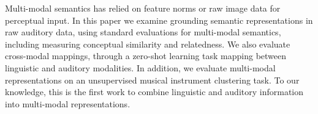 Multi-modal semantics has relied on feature norms or raw image data for perceptual input. In this paper we examine grounding semantic representations in raw auditory data, using standard evaluations for multi-modal semantics, including measuring conceptual similarity and relatedness. We also evaluate cross-modal mappings, through a zero-shot learning task mapping between linguistic and auditory modalities. In addition, we evaluate multi-modal representations on an unsupervised musical instrument clustering task. To our knowledge, this is the first work to combine linguistic and auditory information into multi-modal representations.

